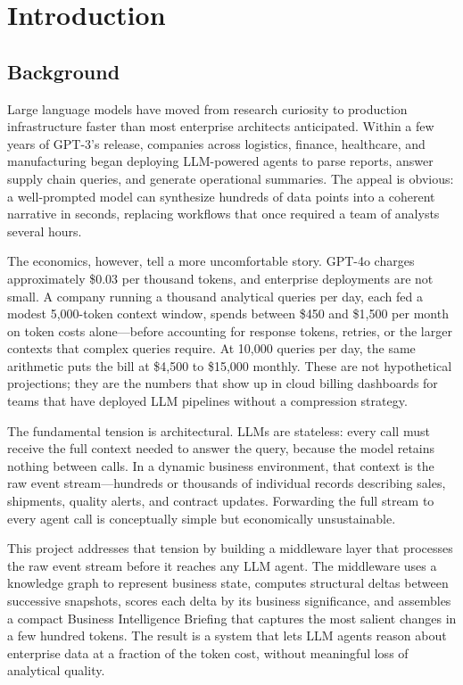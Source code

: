 \chapter{Introduction}
\label{ch:introduction}

\section{Background}
\label{sec:background}

Large language models have moved from research curiosity to production infrastructure faster
than most enterprise architects anticipated. Within a few years of GPT-3's release, companies
across logistics, finance, healthcare, and manufacturing began deploying LLM-powered agents to
parse reports, answer supply chain queries, and generate operational summaries. The appeal is
obvious: a well-prompted model can synthesize hundreds of data points into a coherent narrative
in seconds, replacing workflows that once required a team of analysts several hours.

The economics, however, tell a more uncomfortable story. GPT-4o charges approximately
\$0.03 per thousand tokens, and enterprise deployments are not small. A company running a
thousand analytical queries per day, each fed a modest 5,000-token context window, spends
between \$450 and \$1,500 per month on token costs alone---before accounting for response
tokens, retries, or the larger contexts that complex queries require. At 10,000 queries per
day, the same arithmetic puts the bill at \$4,500 to \$15,000 monthly. These are not
hypothetical projections; they are the numbers that show up in cloud billing dashboards for
teams that have deployed LLM pipelines without a compression strategy.

The fundamental tension is architectural. LLMs are stateless: every call must receive the
full context needed to answer the query, because the model retains nothing between calls.
In a dynamic business environment, that context is the raw event stream---hundreds or
thousands of individual records describing sales, shipments, quality alerts, and contract
updates. Forwarding the full stream to every agent call is conceptually simple but
economically unsustainable.

This project addresses that tension by building a middleware layer that processes the raw
event stream before it reaches any LLM agent. The middleware uses a knowledge graph to
represent business state, computes structural deltas between successive snapshots, scores
each delta by its business significance, and assembles a compact Business Intelligence
Briefing that captures the most salient changes in a few hundred tokens. The result is a
system that lets LLM agents reason about enterprise data at a fraction of the token cost,
without meaningful loss of analytical quality.

